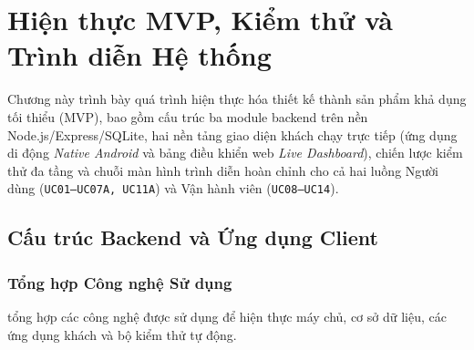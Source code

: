 \section{Hiện thực MVP, Kiểm thử và Trình diễn Hệ thống}

Chương này trình bày quá trình hiện thực hóa thiết kế thành sản phẩm khả dụng tối thiểu (MVP), bao gồm cấu trúc ba module backend trên nền Node.js/Express/SQLite, hai nền tảng giao diện khách chạy trực tiếp (ứng dụng di động \textit{Native Android} và bảng điều khiển web \textit{Live Dashboard}), chiến lược kiểm thử đa tầng và chuỗi màn hình trình diễn hoàn chỉnh cho cả hai luồng Người dùng (\texttt{UC01--UC07A, UC11A}) và Vận hành viên (\texttt{UC08--UC14}).

\subsection{Cấu trúc Backend và Ứng dụng Client}

\subsubsection*{Tổng hợp Công nghệ Sử dụng}

 tổng hợp các công nghệ được sử dụng để hiện thực máy chủ, cơ sở dữ liệu, các ứng dụng khách và bộ kiểm thử tự động.

